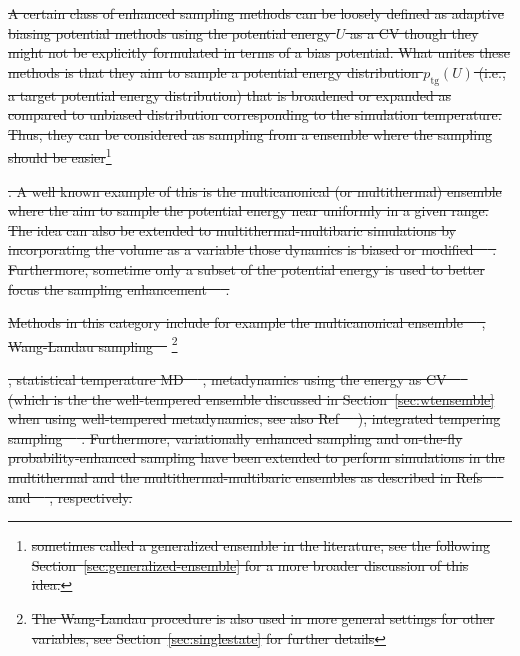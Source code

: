 \documentclass[9pt,review]{livecoms}
\providecommand{\DIFdeltex}[1]{{\protect\color{red}\sout{#1}}}                      %
\providecommand{\DIFdel}[1]{\texorpdfstring{\DIFdeltex{#1}}{}} %
\begin{document}
\DIFdel{A certain class of enhanced sampling methods can be loosely defined as adaptive biasing potential methods using the potential energy $U$ as a CV though they might not be explicitly formulated in terms of a bias potential.
What unites these methods is that they aim to sample a potential energy distribution $p_{\mathrm{tg}}(U)$ (i.e., a target potential energy distribution) that is broadened or expanded as compared to unbiased distribution corresponding to the simulation temperature. Thus, they can be considered as sampling from a ensemble where the sampling should be easier}\footnote{\DIFdel{sometimes called a generalized ensemble in the literature, see the following Section~\ref{sec:generalized-ensemble} for a more broader discussion of this idea.}}%
\addtocounter{footnote}{-1}%
\DIFdel{. A well known example of this is the multicanonical (or multithermal) ensemble where the aim to sample the potential energy near uniformly in a given range. The idea can also be extended to multithermal-multibaric simulations by incorporating the volume as a variable those dynamics is biased or modified~\mbox{%
\cite{Okumura_MultiTP_2004,Shell_MultiTP_2002}}\hspace{0pt}%
. Furthermore, sometime only a subset of the potential energy is used to better focus the sampling enhancement~\mbox{%
\cite{Yang_SITS_2009}}\hspace{0pt}%
.
}%

\DIFdel{Methods in this category include for example
the multicanonical ensemble~\mbox{%
\cite{Berg1992_Multicanonical}}\hspace{0pt}%
,
Wang-Landau sampling~\mbox{%
\cite{wang-landau:prl:2001:wang-landau}}\hspace{0pt}%
}\footnote{\DIFdel{The Wang-Landau procedure is also used in more general settings for other variables, see Section~\ref{sec:singlestate} for further details}}%
\addtocounter{footnote}{-1}%
\DIFdel{,
statistical temperature MD~\mbox{%
\cite{Kim2006_PRL_STMD}}\hspace{0pt}%
,
metadynamics using the energy as CV~\mbox{%
\cite{Micheletti_MetaE_Energy_2004,Bonomi-PRL-2010}
}\hspace{0pt}%
(which is the the well-tempered ensemble discussed in Section~\ref{sec:wtensemble} when using well-tempered metadynamics, see also Ref~\mbox{%
\cite{Valsson-JCTC-2013}}\hspace{0pt}%
),
integrated tempering sampling~\mbox{%
\cite{Gao_ITS_2008,Gao_ITS_Review_2015}}\hspace{0pt}%
.
Furthermore, variationally enhanced sampling and on-the-fly probability-enhanced sampling have been extended to perform simulations in the multithermal and the multithermal-multibaric ensembles as described in Refs~\mbox{%
\citep{Piaggi_MultiVES_2019,Piaggi_MultiVES+CV_2019} }\hspace{0pt}%
and~\mbox{%
\citep{invernizzi2020unified}}\hspace{0pt}%
, respectively.
}%
\end{document}

